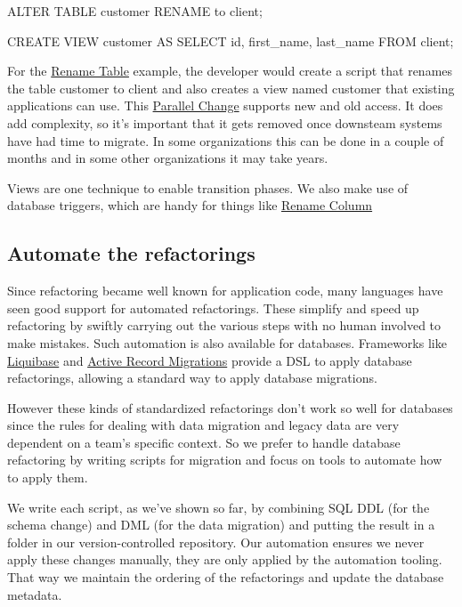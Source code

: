 \documentclass[12pt]{article}
\begin{document}
\begin{sqlcode}

ALTER TABLE customer RENAME to client;

CREATE VIEW customer AS
SELECT id, first_name, last_name FROM client;
\end{sqlcode}

For the \href{http://databaserefactoring.com/RenameTable.html}{Rename
Table} example, the developer would create a script that renames the
table customer to client and also creates a view named customer that
existing applications can use. This
\href{https://martinfowler.com/bliki/ParallelChange.html}{Parallel
Change} supports new and old access. It does add complexity, so it's
important that it gets removed once downsteam systems have had time to
migrate. In some organizations this can be done in a couple of months
and in some other organizations it may take years.

Views are one technique to enable transition phases. We also make use of
database triggers, which are handy for things like
\href{http://databaserefactoring.com/RenameColumn.html}{Rename Column}

\subsection{Automate the refactorings}

Since refactoring became well known for application code, many languages
have seen good support for automated refactorings. These simplify and
speed up refactoring by swiftly carrying out the various steps with no
human involved to make mistakes. Such automation is also available for
databases. Frameworks like \href{http://liquibase.org}{Liquibase} and
\href{http://guides.rubyonrails.org/active_record_migrations.html}{Active
Record Migrations} provide a DSL to apply database refactorings,
allowing a standard way to apply database migrations.

However these kinds of standardized refactorings don't work so well for
databases since the rules for dealing with data migration and legacy
data are very dependent on a team's specific context. So we prefer to
handle database refactoring by writing scripts for migration and focus
on tools to automate how to apply them.

We write each script, as we've shown so far, by combining SQL DDL (for
the schema change) and DML (for the data migration) and putting the
result in a folder in our version-controlled repository. Our automation
ensures we never apply these changes manually, they are only applied by
the automation tooling. That way we maintain the ordering of the
refactorings and update the database metadata.
\end{document}

